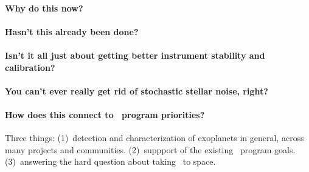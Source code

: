 \documentclass[12pt, letterpaper]{article}
\begin{document}
\paragraph{Why do this now?}

\paragraph{Hasn't this already been done?}

\paragraph{Isn't it all just about getting better instrument stability and calibration?}

\paragraph{You can't ever really get rid of stochastic stellar noise, right?}

\paragraph{How does this connect to \XRP\ program priorities?}

Three things: (1)~detection and characterization of exoplanets in
general, across many projects and communities. (2)~suppport of the
existing \NNEXPLORE\ program goals. (3)~answering the hard question
about taking \EPRV\ to space.
\end{document}
